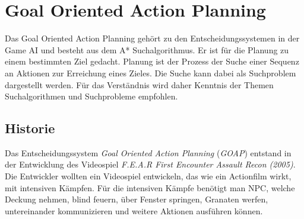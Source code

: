 \chapter{Goal Oriented Action Planning}

Das Goal Oriented Action Planning gehört zu den Entscheidungssystemen in der Game AI und besteht aus dem A* Suchalgorithmus. Er ist für die Planung zu einem bestimmten Ziel gedacht. Planung ist der Prozess der Suche einer Sequenz an Aktionen zur Erreichung eines Zieles. Die Suche kann dabei als Suchproblem dargestellt werden. Für das Verständnis wird daher Kenntnis der Themen Suchalgorithmen und Suchprobleme empfohlen.


\section{Historie}

Das Entscheidungssystem \textit{Goal Oriented Action Planning} (\textit{GOAP}) entstand in der Entwicklung des Videospiel \textit{F.E.A.R First Encounter Assault Recon (2005)}. Die Entwickler wollten ein Videospiel entwickeln, das wie ein Actionfilm wirkt, mit intensiven Kämpfen. Für die intensiven Kämpfe benötigt man NPC, welche Deckung nehmen, blind feuern, über Fenster springen, Granaten werfen, untereinander kommunizieren und weitere Aktionen ausführen können.

